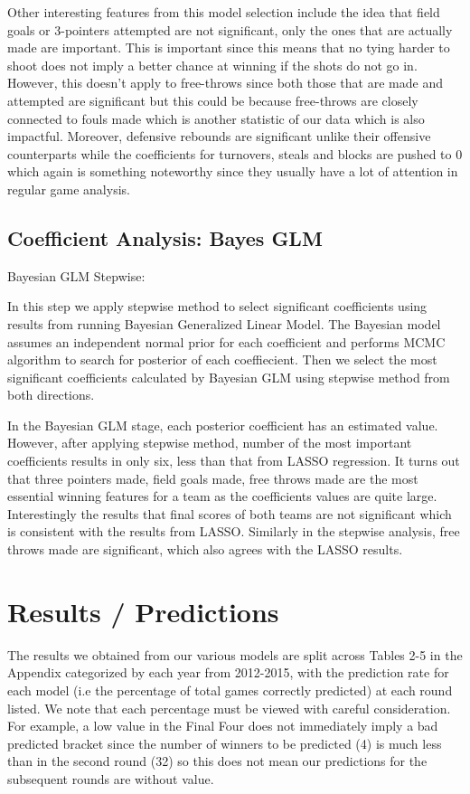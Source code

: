 \documentclass{article} %
\begin{document}
Other interesting features from this model selection include the idea that field goals or 3-pointers attempted are not significant, only the ones that are actually made are important. This is important since this means that no tying harder to shoot does not imply a better chance at winning if the shots do not go in. However, this doesn't apply to free-throws since both those that are made and attempted are significant but this could be because free-throws are closely connected to fouls made which is another statistic of our data which is also impactful. Moreover, defensive rebounds are significant unlike their offensive counterparts while the coefficients for turnovers, steals and blocks are pushed to 0 which again is something noteworthy since they usually have a lot of attention in regular game analysis.\

\subsection{Coefficient Analysis: Bayes GLM}

Bayesian GLM Stepwise:

In this step we apply stepwise method to select significant coefficients using results from running Bayesian Generalized Linear Model. The Bayesian model assumes an independent normal prior for each coefficient and performs MCMC algorithm to search for posterior of each coeffiecient. Then we select the most significant coefficients calculated by Bayesian GLM using stepwise method from both directions.

In the Bayesian GLM stage, each posterior coefficient has an estimated value. However, after applying stepwise method, number of the most important coefficients results in only six, less than that from LASSO regression. It turns out that three pointers made, field goals made, free throws made are the most essential winning features for a team as the coefficients values are quite large. Interestingly the results that final scores of both teams are not significant which is consistent with the results from LASSO. Similarly in the stepwise analysis, free throws made are significant, which also agrees with the LASSO results.

\section{Results / Predictions}

The results we obtained from our various models are split across Tables 2-5 in the Appendix categorized by each year from 2012-2015, with the prediction rate for each model (i.e the percentage of total games correctly predicted) at each round listed. We note that each percentage must be viewed with careful consideration. For example, a low value in the Final Four does not immediately imply a bad predicted bracket since the number of winners to be predicted (4) is much less than in the second round (32) so this does not mean our predictions for the subsequent rounds are without value.
\end{document}
